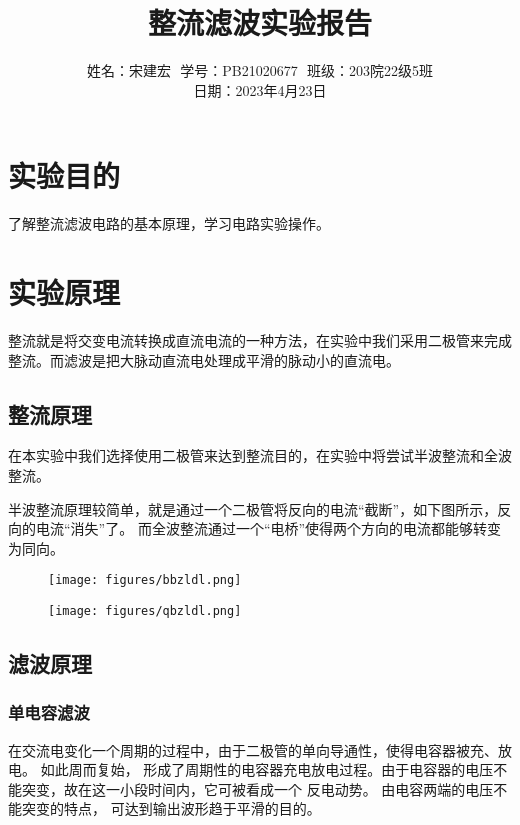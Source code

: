 \documentclass{article}
\title{整流滤波实验报告}
\author{姓名：宋建宏\,\, 学号：PB21020677\,\, 班级：203院22级5班\\ 日期：2023年4月23日}
\date{}
\begin{document}
\maketitle
\section*{实验目的}
了解整流滤波电路的基本原理，学习电路实验操作。

\section*{实验原理}

整流就是将交变电流转换成直流电流的一种方法，在实验中我们采用二极管来完成整流。而滤波是把大脉动直流电处理成平滑的脉动小的直流电。

\subsection*{整流原理}
在本实验中我们选择使用二极管来达到整流目的，在实验中将尝试半波整流和全波整流。

半波整流原理较简单，就是通过一个二极管将反向的电流“截断”，如下图所示，反向的电流“消失”了。
而全波整流通过一个“电桥”使得两个方向的电流都能够转变为同向。

\begin{figure}[htbp]
    \centering
    \begin{minipage}[t]{0.48\textwidth}
        \centering
        \texttt{[image: figures/bbzldl.png]}

    \end{minipage}
    \begin{minipage}[t]{0.48\textwidth}
        \centering
        \texttt{[image: figures/qbzldl.png]}
    \end{minipage}
\end{figure}


\subsection*{滤波原理}
\subsubsection*{单电容滤波}
在交流电变化一个周期的过程中，由于二极管的单向导通性，使得电容器被充、放电。 如此周而复始，
形成了周期性的电容器充电放电过程。由于电容器的电压不能突变，故在这一小段时间内，它可被看成一个
反电动势。 由电容两端的电压不能突变的特点， 可达到输出波形趋于平滑的目的。
\end{document}
